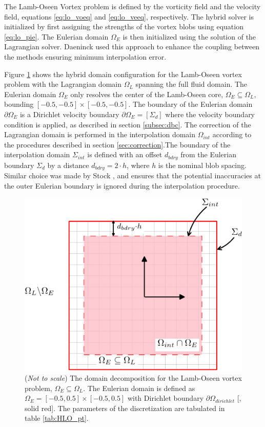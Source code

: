 The Lamb-Oseen Vortex problem is defined by the vorticity field and the velocity field, equations \ref{eq:lo_voeq} and \ref{eq:lo_veeq}, respectively. The hybrid solver is initialized by first assigning the strengths of the vortex blobs using equation \ref{eq:lo_pie}. The Eulerian domain $\Omega_E$ is then initialized using the solution of the Lagrangian solver. Daeninck \cite{Daeninck2006} used this approach to enhance the coupling between the methods ensuring minimum interpolation error.

Figure \ref{fig:HLO_dc} shows the hybrid domain configuration for the Lamb-Oseen vortex problem with the Lagrangian domain $\Omega_L$ spanning the full fluid domain. The Eulerian domain $\Omega_E$ only resolves the center of the Lamb-Oseen core, $\Omega_E \subseteq \Omega_L$, bounding $[-0.5,-0.5] \times [-0.5,-0.5]$. The boundary of the Eulerian domain $\partial \Omega_E$ is a Dirichlet velocity boundary $\partial \Omega_E = [\Sigma_d]$ where the velocity boundary condition is applied, as described in section \ref{subsec:dbc}. The correction of the Lagrangian domain is performed in the interpolation domain $\Omega_{int}$ according to the procedures described in section \ref{sec:correction}.The boundary of the interpolation domain $\Sigma_{int}$ is defined with an offset $d_{bdry}$ from the Eulerian boundary $\Sigma_d$ by a distance $d_{bdry} = 2\cdot h$, where $h$ is the nominal blob spacing. Similar choice was made by Stock \cite{Stock2010a}, and ensures that the potential inaccuracies at the outer Eulerian boundary is ignored during the interpolation procedure.  

	\begin{figure}[!t]
	\showthe\columnwidth
	\centering
	\includegraphics[width=0.5\linewidth]{./figures/hybrid/lambOseen/hlo_dd-crop.pdf}
	\caption{(\emph{Not to scale}) The domain decomposition for the Lamb-Oseen vortex problem, $\Omega_E \subseteq \Omega_L$. The Eulerian domain is defined as $\Omega_E = [-0.5,0.5]\times[-0.5,0.5]$ with Dirichlet boundary $\partial \Omega_{dirichlet}$ [{\color{plotRed}{---}}, solid red]. The parameters of the discretization are tabulated in table \ref{tab:HLO_pt}.}
	\label{fig:HLO_dc}
	\end{figure}

